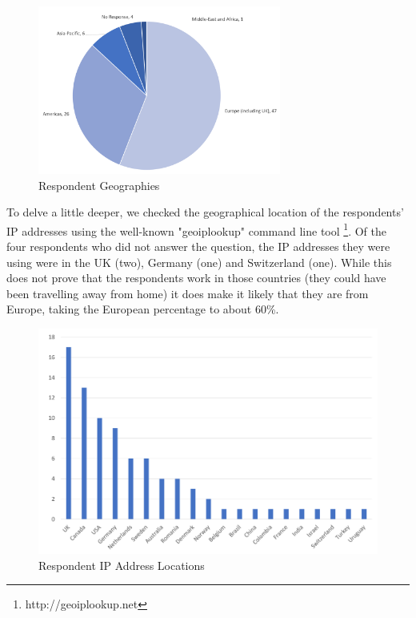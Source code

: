 \begin{figure}
\centering
\includegraphics[width=8cm,trim={2 2 2 2},clip]{Figures/prioritisation-regions}
\caption{Respondent Geographies}
\label{figure:geographies}
\end{figure}

To delve a little deeper, we checked the geographical location of the respondents' IP addresses using the well-known "geoiplookup" command line tool \footnote{http://geoiplookup.net}.  Of the four respondents who did not answer the question, the IP addresses they were using were in the UK (two), Germany (one) and Switzerland (one).  While this does not prove that the respondents work in those countries (they could have been travelling away from home) it does make it likely that they are from Europe, taking the European percentage to about 60\%.
 
\begin{figure}
\centering
\includegraphics[width=12cm,trim={2 2 2 2},clip]{Figures/prioritisation-iplocation}
\caption{Respondent IP Address Locations}
\label{figure:iplocations}
\end{figure}

